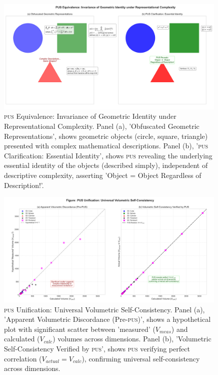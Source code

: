 \documentclass[11pt, a4paper]{article}
\newcommand{\pus}{\textsc{pus}} %
\begin{document}
\FloatBarrier

\begin{figure}[htbp]
    \centering
    \includegraphics[width=0.99\textwidth]{figures/pus_figure4_geometric_identity.png} %
    \caption{\pus{} Equivalence: Invariance of Geometric Identity under Representational Complexity. Panel (a), 'Obfuscated Geometric Representations', shows geometric objects (circle, square, triangle) presented with complex mathematical descriptions. Panel (b), '\pus{} Clarification: Essential Identity', shows \pus{} revealing the underlying essential identity of the objects (described simply), independent of descriptive complexity, asserting 'Object = Object Regardless of Description!'.}
    \label{fig:equivalence}
\end{figure}
\FloatBarrier 

\begin{figure}[htbp]
    \centering
    \includegraphics[width=0.99\textwidth]{figures/pus_figure4_volume_comparison_highD.png} %
    \caption{\pus{} Unification: Universal Volumetric Self-Consistency. Panel (a), 'Apparent Volumetric Discordance (Pre-\pus)', shows a hypothetical plot with significant scatter between 'measured' ($V_{meas}$) and calculated ($V_{calc}$) volumes across dimensions. Panel (b), 'Volumetric Self-Consistency Verified by \pus', shows \pus{} verifying perfect correlation ($V_{actual} = V_{calc}$), confirming universal self-consistency across dimensions.}
    \label{fig:volume}
\end{figure}
\FloatBarrier 
\end{document}
